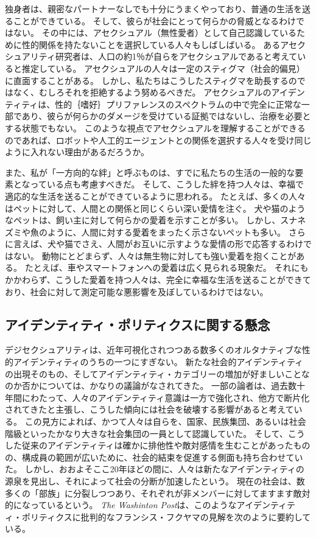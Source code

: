 \documentclass[paper=a4,book,openany]{jlreq}
\begin{document}
独身者は、親密なパートナーなしでも十分にうまくやっており、普通の生活を送ることができている。
そして、彼らが社会にとって何らかの脅威となるわけではない。
その中には、アセクシュアル（無性愛者）として自己認識しているために性的関係を持たないことを選択している人々もしばしばいる。
あるアセクシュアリティ研究者は、人口の約1％が自らをアセクシュアルであると考えていると推定している\citep{bogaert04:_asexual}。
アセクシュアルの人々は一定のスティグマ（社会的偏見）に直面することがある。
しかし、私たちはこうしたスティグマを助長するのではなく、むしろそれを拒絶するよう努めるべきだ。
アセクシュアルのアイデンティティは、性的｛嗜好｝{プリファレンス}のスペクトラムの中で完全に正常な一部であり、彼らが何らかのダメージを受けている証拠ではないし、治療を必要とする状態でもない。
このような視点でアセクシュアルを理解することができるのであれば、ロボットや人工的エージェントとの関係を選択する人々を受け同じように入れない理由があるだろうか。

また、私が「一方向的な絆」と呼ぶものは、すでに私たちの生活の一般的な要素となっている点も考慮すべきだ。
そして、こうした絆を持つ人々は、幸福で適応的な生活を送ることができているように思われる。
たとえば、多くの人々はペットに対して、人間との関係と同じくらい深い愛情を注ぐ。
犬や猫のようなペットは、飼い主に対して何らかの愛着を示すことが多い。
しかし、スナネズミや魚のように、人間に対する愛着をまったく示さないペットも多い。
さらに言えば、犬や猫でさえ、人間がお互いに示すような愛情の形で応答するわけではない。
動物にとどまらず、人々は無生物に対しても強い愛着を抱くことがある。
たとえば、車やスマートフォンへの愛着は広く見られる現象だ。
それにもかかわらず、こうした愛着を持つ人々は、完全に幸福な生活を送ることができており、社会に対して測定可能な悪影響を及ぼしているわけではない。

\subsection{アイデンティティ・ポリティクスに関する懸念}

デジセクシュアリティは、近年可視化されつつある数多くのオルタナティブな性的アイデンティティのうちの一つにすぎない。
新たな社会的アイデンティティの出現そのもの、そしてアイデンティティ・カテゴリーの増加が好ましいことなのか否かについては、かなりの議論がなされてきた。
一部の論者は、過去数十年間にわたって、人々のアイデンティティ意識は一方で強化され、他方で断片化されてきたと主張し、こうした傾向には社会を破壊する影響があると考えている。
この見方によれば、かつて人々は自らを、国家、民族集団、あるいは社会階級といったかなり大きな社会集団の一員として認識していた。
そして、こうした従来のアイデンティティは確かに排他性や敵対感情を生むことがあったものの、構成員の範囲が広いために、社会的結束を促進する側面も持ち合わせていた。
しかし、おおよそここ20年ほどの間に、人々は新たなアイデンティティの源泉を見出し、それによって社会の分断が加速したという。
現在の社会は、数多くの「部族」に分裂しつつあり、それぞれが非メンバーに対してますます敵対的になっているという。
\emph{The Washinton Post}は、このようなアイデンティティ・ポリティクスに批判的なフランシス・フクヤマの見解を次のように要約している。
\end{document}
